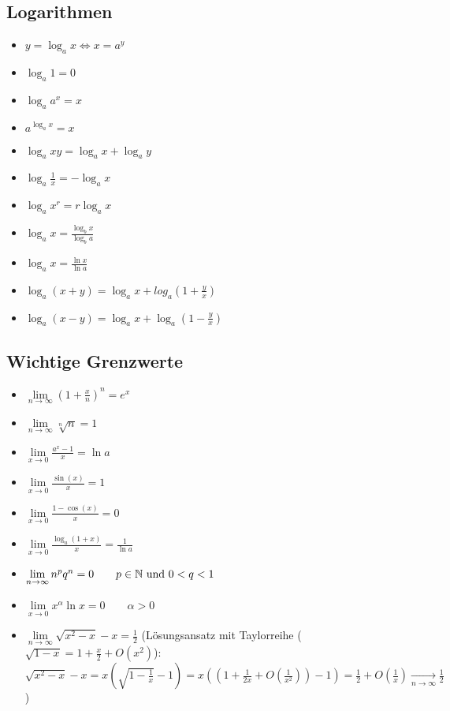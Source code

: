 \subsection{Logarithmen}
\begin{itemize}[leftmargin=*]
  \item $y = \log_a x \Leftrightarrow x = a^y$
  \item $\log_a 1 = 0$
  \item $\log_a a^x = x$
  \item $a^{\log_a x} = x $
  \item $\log_a xy = \log_a x + \log_a y$
  \item $\log_a \frac{1}{x} = - \log_a x$
  \item $\log_a x^r = r \log_a x$
  \item $\log_a x = \frac{\log_b x}{\log_b a}$
  \item $\log_a x = \frac{\ln x}{\ln a}$
  \item $\log_a (x+y) = \log_a x + log_a (1 + \frac{y}{x})$
  \item $\log_a (x-y) = \log_a x + \log_a (1- \frac{y}{x})$
\end{itemize}

\subsection{Wichtige Grenzwerte}
			
\begin{itemize}[leftmargin=*]
  \item $ \lim\limits_{n \to \infty} \left( 1+\frac{x}{n} \right)^n = e^x \quad $
  \item $ \lim\limits_{n \to \infty} \sqrt[n]{n} = 1 $ 
  \item  $ \lim\limits_{x \to 0} \frac{a^x-1}{x} = \ln a $ 
  \item $ \lim\limits_{x \to 0} \frac{\sin(x)}{x} = 1 $ 
  \item $ \lim\limits_{x \to 0} \frac{1-\cos(x)}{x} = 0 \quad $ 
  \item  $ \lim\limits_{x \to 0} \frac{\log_a(1+x)}{x} = \frac{1}{\ln a} $
  \item $ \lim\limits_{n \to \infty} n^p q^n = 0 \qquad p \in \mathbb{N} \text{ und } 0 < q < 1 $
  \item $ \lim\limits_{x \to 0} x^\alpha \ln x = 0 \qquad \alpha > 0 $
  \item $ \lim\limits_{n \to \infty} \sqrt{x^2-x}-x = \frac{1}{2}$ (Lösungsansatz mit Taylorreihe ($\sqrt{1-x} = 1 + \frac{x}{2}+O(x^2)$): $\sqrt{x^2-x}-x = x(\sqrt{1-\frac{1}{x}}-1) = x((1+\frac{1}{2x}+O(\frac{1}{x^2}))-1) = \frac{1}{2}+O(\frac{1}{x}) \underset{n \to \infty}{\longrightarrow} \frac{1}{2} $ )
\end{itemize}

